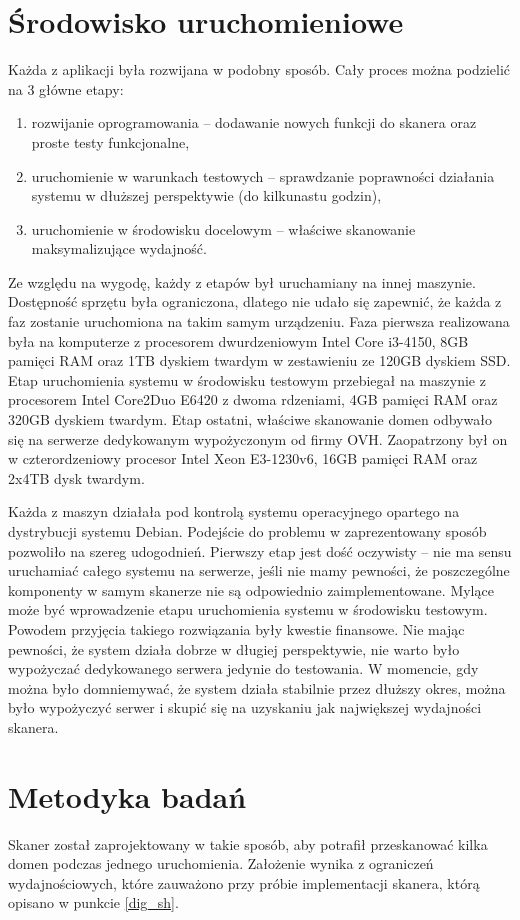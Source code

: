 \section{Środowisko uruchomieniowe}
Każda z aplikacji była rozwijana w podobny sposób. Cały proces można podzielić na 3 główne etapy:
\begin{enumerate}
	\item rozwijanie oprogramowania -- dodawanie nowych funkcji do skanera oraz proste testy funkcjonalne,
	\item uruchomienie w warunkach testowych -- sprawdzanie poprawności działania systemu w dłuższej perspektywie (do kilkunastu godzin),
	\item uruchomienie w środowisku docelowym -- właściwe skanowanie maksymalizujące wydajność.
\end{enumerate}
Ze względu na wygodę, każdy z etapów był uruchamiany na innej maszynie. Dostępność sprzętu była ograniczona, dlatego nie udało się
zapewnić, że każda z faz zostanie uruchomiona na takim samym urządzeniu. Faza pierwsza realizowana była na komputerze z procesorem
dwurdzeniowym Intel Core i3-4150, 8GB pamięci RAM oraz 1TB dyskiem twardym w zestawieniu ze 120GB dyskiem SSD. Etap uruchomienia systemu w
środowisku testowym przebiegał na maszynie z procesorem Intel Core2Duo E6420 z dwoma rdzeniami, 4GB pamięci RAM oraz 320GB dyskiem twardym. Etap ostatni,
właściwe skanowanie domen odbywało się na serwerze dedykowanym wypożyczonym od firmy OVH. Zaopatrzony był on w czterordzeniowy
procesor Intel Xeon E3-1230v6, 16GB pamięci RAM oraz 2x4TB dysk twardym.

Każda z maszyn działała pod kontrolą systemu operacyjnego opartego na dystrybucji systemu Debian. Podejście do problemu
w zaprezentowany sposób pozwoliło na szereg udogodnień. Pierwszy etap jest dość oczywisty -- nie ma sensu uruchamiać całego systemu
na serwerze, jeśli nie mamy pewności, że poszczególne komponenty w samym skanerze nie są odpowiednio zaimplementowane. Mylące może
być wprowadzenie etapu uruchomienia systemu w środowisku testowym. Powodem przyjęcia takiego rozwiązania były kwestie finansowe.
Nie mając pewności, że system działa dobrze w długiej perspektywie, nie warto było wypożyczać dedykowanego serwera jedynie do testowania.
W momencie, gdy można było domniemywać, że system działa stabilnie przez dłuższy okres, można było wypożyczyć serwer i skupić się
na uzyskaniu jak największej wydajności skanera.

\section{Metodyka badań}
Skaner został zaprojektowany w takie sposób, aby potrafił przeskanować kilka domen podczas jednego uruchomienia. Założenie wynika z
ograniczeń wydajnościowych, które zauważono przy próbie implementacji skanera, którą opisano w punkcie \ref{dig_sh}.

